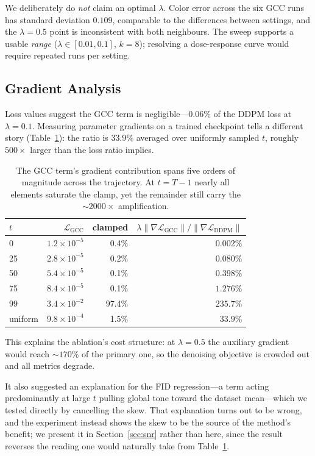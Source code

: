\documentclass[11pt]{article}
\begin{document}
We deliberately do \emph{not} claim an optimal $\lambda$. Color error across the
six GCC runs has standard deviation $0.109$, comparable to the differences
between settings, and the $\lambda{=}0.5$ point is inconsistent with both
neighbours. The sweep supports a usable \emph{range} ($\lambda \in [0.01, 0.1]$,
$k=8$); resolving a dose-response curve would require repeated runs per setting.

\subsection{Gradient Analysis}

Loss values suggest the GCC term is negligible---$0.06\%$ of the DDPM loss at
$\lambda=0.1$. Measuring parameter gradients on a trained checkpoint tells a
different story (Table~\ref{tab:grad}): the ratio is $33.9\%$ averaged over
uniformly sampled $t$, roughly $500\times$ larger than the loss ratio implies.

\begin{table}[t]
\centering
\small
\begin{tabular}{lrrr}
\toprule
$t$ & $\mathcal{L}_{\text{GCC}}$ & clamped & $\lambda\|\nabla \mathcal{L}_{\text{GCC}}\| / \|\nabla \mathcal{L}_{\text{DDPM}}\|$ \\
\midrule
0        & $1.2\times10^{-5}$ & 0.4\%  & $0.002\%$ \\
25       & $2.8\times10^{-5}$ & 0.2\%  & $0.080\%$ \\
50       & $5.4\times10^{-5}$ & 0.1\%  & $0.398\%$ \\
75       & $8.4\times10^{-5}$ & 0.1\%  & $1.276\%$ \\
99       & $3.4\times10^{-2}$ & 97.4\% & $\mathbf{235.7\%}$ \\
uniform  & $9.8\times10^{-4}$ & 1.5\%  & $\mathbf{33.9\%}$ \\
\bottomrule
\end{tabular}
\caption{The GCC term's gradient contribution spans five orders of magnitude
across the trajectory. At $t{=}T{-}1$ nearly all elements saturate the clamp, yet
the remainder still carry the ${\sim}2000\times$ amplification.}
\label{tab:grad}
\end{table}

This explains the ablation's cost structure: at $\lambda=0.5$ the auxiliary
gradient would reach ${\sim}170\%$ of the primary one, so the denoising objective
is crowded out and all metrics degrade.

It also suggested an explanation for the FID regression---a term acting
predominantly at large $t$ pulling global tone toward the dataset
mean---which we tested directly by cancelling the skew. That explanation turns
out to be wrong, and the experiment instead shows the skew to be the source of
the method's benefit; we present it in Section~\ref{sec:snr} rather than here,
since the result reverses the reading one would naturally take from
Table~\ref{tab:grad}.
\end{document}
